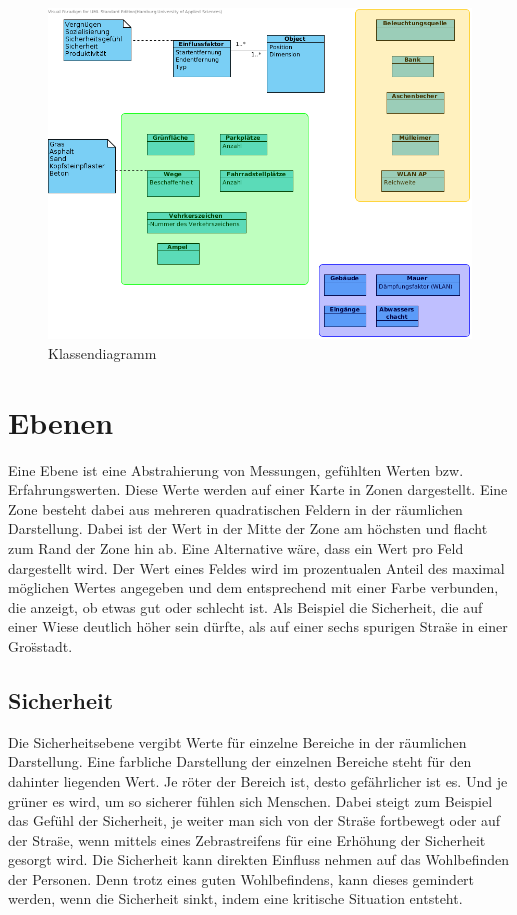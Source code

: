 \documentclass[10pt]{scrartcl}
\begin{document}
	\begin{figure}[H]
    	\label{fig:fachlichesDatenmodellUebersicht}
			\includegraphics[width=\textwidth]{img/ClassDiagram.png}
            \caption{Klassendiagramm}
             \label{img:classDiagram}
	\end{figure} 	
	
\section{Ebenen}\label{sec:Ebenen}
Eine Ebene ist eine Abstrahierung von Messungen, gef\"uhlten Werten bzw. Erfahrungswerten. Diese Werte werden auf einer Karte in Zonen dargestellt. Eine Zone besteht dabei aus mehreren quadratischen Feldern in der r\"aumlichen Darstellung. Dabei ist der Wert in der Mitte der Zone am h\"ochsten und flacht zum Rand der Zone hin ab. Eine Alternative w\"are, dass ein Wert pro Feld dargestellt wird.
\newline Der Wert eines Feldes wird im prozentualen Anteil des maximal m\"oglichen Wertes angegeben und dem entsprechend mit einer Farbe verbunden, die anzeigt, ob etwas gut oder schlecht ist. Als Beispiel die Sicherheit, die auf einer Wiese deutlich h\"oher sein d\"urfte, als auf einer sechs spurigen Stra\"se in einer Gro\"sstadt.

\subsection{Sicherheit}
Die Sicherheitsebene vergibt Werte f\"ur einzelne Bereiche in der r\"aumlichen Darstellung. Eine farbliche Darstellung der einzelnen Bereiche steht f\"ur den dahinter liegenden Wert. Je r\"oter der Bereich ist, desto gef\"ahrlicher ist es. Und je gr\"uner es wird, um so sicherer f\"uhlen sich Menschen. Dabei steigt zum Beispiel das Gef\"uhl der Sicherheit, je weiter man sich von der Stra\"se fortbewegt oder auf der Stra\"se, wenn mittels eines Zebrastreifens f\"ur eine Erh\"ohung der Sicherheit gesorgt wird.
\newline Die Sicherheit kann direkten Einfluss nehmen auf das Wohlbefinden der Personen. Denn trotz eines guten Wohlbefindens, kann dieses gemindert werden, wenn die Sicherheit sinkt, indem eine kritische Situation entsteht.
\end{document}
